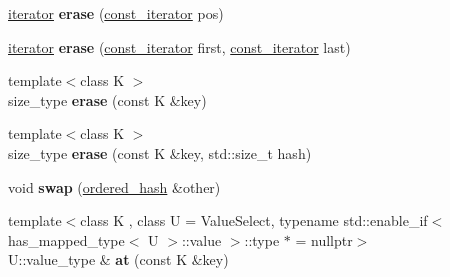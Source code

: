 \begin{DoxyCompactItemize}
\item 
\mbox{\label{classtsl_1_1detail__ordered__hash_1_1ordered__hash_a3c5ee339dbb4ddec112afeb0a9e28df3}} 
\mbox{\hyperlink{classtsl_1_1detail__ordered__hash_1_1ordered__hash_1_1ordered__iterator}{iterator}} {\bfseries erase} (\mbox{\hyperlink{classtsl_1_1detail__ordered__hash_1_1ordered__hash_1_1ordered__iterator}{const\+\_\+iterator}} pos)
\item 
\mbox{\label{classtsl_1_1detail__ordered__hash_1_1ordered__hash_aabca2d60f8fba8624e113072368f6730}} 
\mbox{\hyperlink{classtsl_1_1detail__ordered__hash_1_1ordered__hash_1_1ordered__iterator}{iterator}} {\bfseries erase} (\mbox{\hyperlink{classtsl_1_1detail__ordered__hash_1_1ordered__hash_1_1ordered__iterator}{const\+\_\+iterator}} first, \mbox{\hyperlink{classtsl_1_1detail__ordered__hash_1_1ordered__hash_1_1ordered__iterator}{const\+\_\+iterator}} last)
\item 
\mbox{\label{classtsl_1_1detail__ordered__hash_1_1ordered__hash_afcb2edec16f1ee6d606f3560b8109b8e}} 
{\footnotesize template$<$class K $>$ }\\size\+\_\+type {\bfseries erase} (const K \&key)
\item 
\mbox{\label{classtsl_1_1detail__ordered__hash_1_1ordered__hash_aa950113548f28fb2cacecd765646b48b}} 
{\footnotesize template$<$class K $>$ }\\size\+\_\+type {\bfseries erase} (const K \&key, std\+::size\+\_\+t hash)
\item 
\mbox{\label{classtsl_1_1detail__ordered__hash_1_1ordered__hash_ae79a8d5ab2d61f8c17517343fb172294}} 
void {\bfseries swap} (\mbox{\hyperlink{classtsl_1_1detail__ordered__hash_1_1ordered__hash}{ordered\+\_\+hash}} \&other)
\item 
\mbox{\label{classtsl_1_1detail__ordered__hash_1_1ordered__hash_ad2e17b6465067143188af39bc9624251}} 
{\footnotesize template$<$class K , class U  = Value\+Select, typename std\+::enable\+\_\+if$<$ has\+\_\+mapped\+\_\+type$<$ U $>$\+::value $>$\+::type $\ast$  = nullptr$>$ }\\U\+::value\+\_\+type \& {\bfseries at} (const K \&key)

\end{DoxyCompactItemize}
